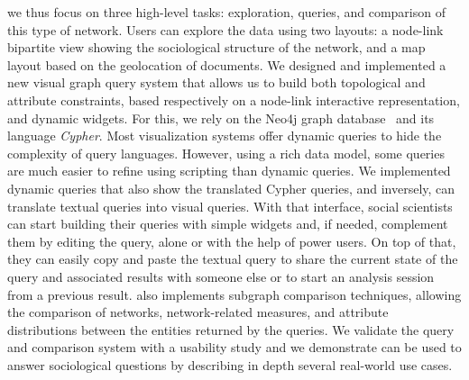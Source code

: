 we thus focus on three high-level tasks: exploration, queries, and comparison of this type of network. Users can explore the data using two layouts: a node-link bipartite view showing the sociological structure of the network, and a map layout based on the geolocation of documents.
We designed and implemented a new visual graph query system that allows us to build both topological and attribute constraints, based respectively on a node-link interactive representation, and dynamic widgets. For this, we rely on the Neo4j graph database~\cite{neo4j} and its language \emph{Cypher}. Most visualization systems offer dynamic queries to hide the complexity of query languages. However, using a rich data model, some queries are much easier to refine using scripting than dynamic queries. We implemented dynamic queries that also show the translated Cypher queries, and inversely, can translate textual queries into visual queries.
With that interface, social scientists can start building their queries with simple widgets and, if needed, complement them by editing the query, alone or with the help of power users. On top of that, they can easily copy and paste the textual query to share the current state of the query and associated results with someone else or to start an analysis session from a previous result.
\name also implements subgraph comparison techniques, allowing the comparison of networks, network-related measures, and attribute distributions between the entities returned by the queries.
We validate the query and comparison system with a usability study and we demonstrate \name can be used to answer sociological questions by describing in depth several real-world use cases.


